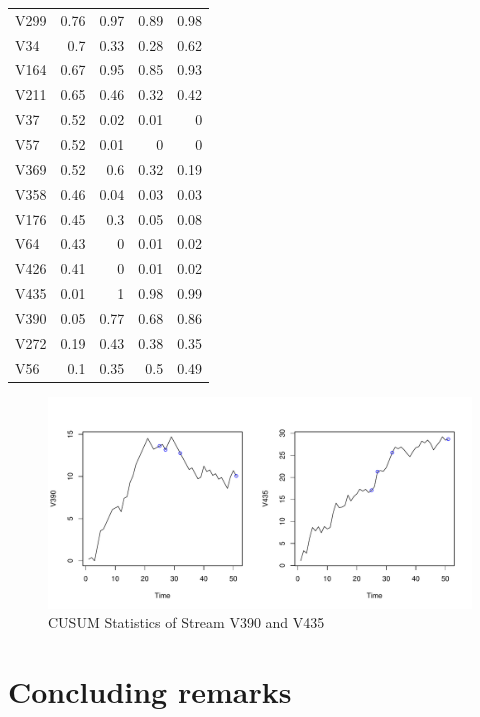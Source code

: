 \documentclass[a4paper,12pt]{article}
\begin{document}
\begin{table}[htbp]
\begin{tabular}{lrrrr}
    V299 & 0.76 & 0.97 & 0.89 & 0.98 \\
    V34 & 0.7 & 0.33 & 0.28 & 0.62 \\
    V164 & 0.67 & 0.95 & 0.85 & 0.93 \\
    V211 & 0.65 & 0.46 & 0.32 & 0.42 \\
    V37 & 0.52 & 0.02 & 0.01 & 0 \\
    V57 & 0.52 & 0.01 & 0 & 0 \\
    V369 & 0.52 & 0.6 & 0.32 & 0.19 \\
    V358 & 0.46 & 0.04 & 0.03 & 0.03 \\
    V176 & 0.45 & 0.3 & 0.05 & 0.08 \\
    V64 & 0.43 & 0 & 0.01 & 0.02 \\
    V426 & 0.41 & 0 & 0.01 & 0.02 \\
    V435 & 0.01 & 1 & 0.98 & 0.99 \\
    V390 & 0.05 & 0.77 & 0.68 & 0.86 \\
    V272 & 0.19 & 0.43 & 0.38 & 0.35 \\
    V56 & 0.1 & 0.35 & 0.5 & 0.49 \\
      \midrule
    \end{tabular}%
  \label{tab:addlabel}%
\end{table}%


\begin{figure}[H]
\centering
\includegraphics[scale=0.6]{390435}
\caption{CUSUM Statistics of Stream V390 and V435}
\end{figure}


\section{Concluding remarks}
\end{document}
